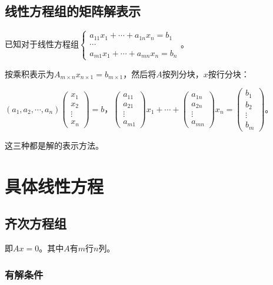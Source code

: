 \documentclass[UTF8, 12pt]{ctexart}
\begin{document}
\subsection{线性方程组的矩阵解表示}

已知对于线性方程组$\begin{cases}
    a_{11}x_1+\cdots+a_{1n}x_n=b_1 \\
    \cdots \\
    a_{m1}x_1+\cdots+a_{mn}x_n=b_n
\end{cases}$。

按乘积表示为$A_{m\times n}x_{n\times 1}=b_{m\times 1}$，然后将$A$按列分块，$x$按行分块：\medskip

$(a_1,a_2,\cdots,a_n)\left(\begin{array}{c}
    x_1 \\
    x_2 \\
    \vdots \\
    x_n
\end{array}\right)=b\text{，}\left(\begin{array}{c}
    a_{11} \\
    a_{21} \\
    \vdots \\
    a_{m1}
\end{array}\right)x_1+\cdots+\left(\begin{array}{c}
    a_{1n} \\
    a_{2n} \\
    \vdots \\
    a_{mn}
\end{array}\right)x_n=\left(\begin{array}{c}
    b_1 \\
    b_2 \\
    \vdots \\
    b_m
\end{array}\right)\text{。}$

这三种都是解的表示方法。

\section{具体线性方程}

\subsection{齐次方程组}

即$Ax=0$。其中$A$有$m$行$n$列。

\subsubsection{有解条件}
\end{document}
